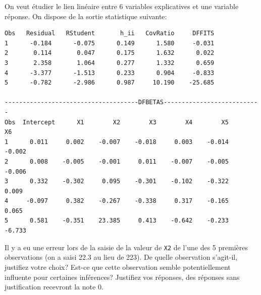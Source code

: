 \begin{questions}
\newpage




\question[8]\label{influence}

On veut étudier le lien linéaire entre 6 variables explicatives et une variable réponse. On dispose de la sortie statistique suivante:

\begin{verbatim}
Obs   Residual   RStudent       h_ii   CovRatio     DFFITS
1      -0.184      -0.075      0.149      1.580     -0.031
2       0.114       0.047      0.175      1.632      0.022
3       2.358       1.064      0.277      1.332      0.659
4      -3.377      -1.513      0.233      0.904     -0.833
5      -0.782      -2.986      0.987     10.190    -25.685

-------------------------------------DFBETAS---------------------------
Obs  Intercept      X1        X2        X3        X4        X5        X6
1      0.011     0.002    -0.007    -0.018     0.003    -0.014    -0.002
2      0.008    -0.005    -0.001     0.011    -0.007    -0.005    -0.006
3      0.332    -0.302     0.095    -0.301    -0.102    -0.322     0.009
4     -0.097     0.382    -0.267    -0.338     0.317    -0.165     0.065
5      0.581    -0.351    23.385     0.413    -0.642    -0.233    -6.733

\end{verbatim}

Il y a eu une erreur lors de la saisie de la valeur de \texttt{X2} de l'une des 5 premières observations (on a saisi 22.3 au lieu de 223). De quelle observation s'agit-il, justifiez votre choix? Est-ce que cette observation semble potentiellement influente pour certaines inférences? Justifiez vos réponses, des réponses sans justification recevront la note 0.

\newpage


\end{questions}
